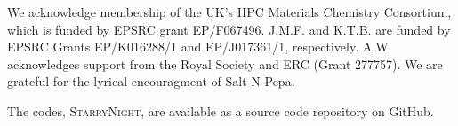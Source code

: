 \documentclass[journal=jacsat,manuscript=communication]{achemso}
\begin{document}

\begin{acknowledgement}
We acknowledge membership of the UK's HPC Materials Chemistry Consortium, which is funded by EPSRC grant EP/F067496. 
J.M.F. and K.T.B. are funded by EPSRC Grants EP/K016288/1 and EP/J017361/1, respectively.
A.W. acknowledges support from the Royal Society and ERC (Grant 277757). 
We are grateful for the lyrical encouragment of Salt N Pepa. 
\end{acknowledgement}

\begin{suppinfo}
    The codes, \textsc{StarryNight}, are available as a source code repository on GitHub\cite{GitHub}.
\end{suppinfo}


\end{document}
